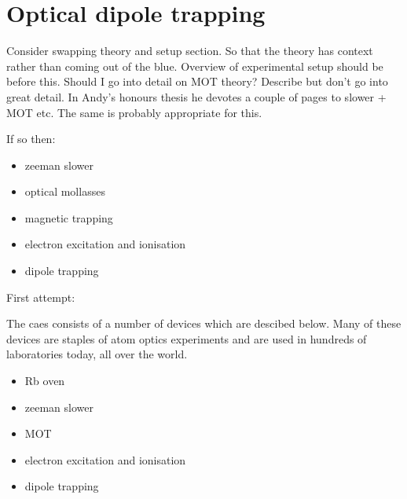 \chapter{Optical dipole trapping}

Consider swapping theory and setup section. So that the theory has context rather than coming out of the blue.
Overview of experimental setup should be before this.
Should I go into detail on MOT theory?
Describe but don't go into great detail. In Andy's honours thesis he devotes a couple of pages to slower + MOT etc. The same is probably appropriate for this.

If so then:
\begin{itemize}
	\item zeeman slower
	\item optical mollasses
	\item magnetic trapping
	\item electron excitation and ionisation
	\item dipole trapping
\end{itemize}


First attempt:

The \gls{caes} consists of a number of devices which are descibed below. Many of these devices are staples of atom optics experiments and are used in hundreds of laboratories today, all over the world.

\begin{itemize}
	\item Rb oven
	\item zeeman slower
	\item MOT
	\item electron excitation and ionisation
	\item dipole trapping
\end{itemize}



